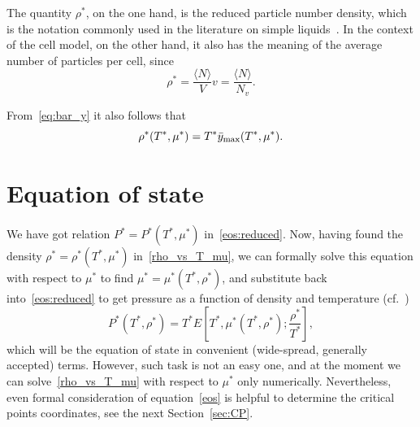 \documentclass[12pt]{article}
\numberwithin{equation}{section}
\begin{document}
	The quantity $\rho^*$, on the one hand, is the reduced particle number density, which is the notation commonly used in the literature on simple liquids~\cite{HansenMcDonald13}. In the context of the cell model, on the other hand, it also has the meaning of the average number of particles per cell, since
	\begin{equation}
		\rho^* = \frac{\langle N \rangle}{V} v = \frac{\langle N \rangle}{N_v}.
	\end{equation}
	
	From~\eqref{eq:bar_y} it also follows that
	\begin{equation}
		\label{rho_vs_T_mu}
		\rho^*(T^*,\mu^*) = T^* \bar{y}_{\rm max}(T^*,\mu^*).
	\end{equation}
	
	\section{Equation of state}
	We have got relation $P^* = P^*(T^*, \mu^*)$ in~\eqref{eos:reduced}. Now, having found the density $\rho^* = \rho^*(T^*,\mu^*)$ in~\eqref{rho_vs_T_mu}, we can formally solve this equation with respect to $\mu^*$ to find $\mu^* = \mu^*(T^*,\rho^*)$, and substitute back into~\eqref{eos:reduced} to get pressure as a function of density and temperature (cf.~\cite[(2.28)]{KKD20})
	\begin{equation}
		\label{eos}
		P^*(T^*,\rho^*) = T^* E\left[T^*, \mu^*(T^*,\rho^*); \frac{\rho^*}{T^*}\right],
	\end{equation}
	which will be the equation of state in convenient (wide-spread, generally accepted) terms. However, such task is not an easy one, and at the moment we can solve~\eqref{rho_vs_T_mu} with respect to $\mu^*$ only numerically. Nevertheless, even formal consideration of equation~\eqref{eos} is helpful to determine the critical points coordinates, see the next Section~\ref{sec:CP}.
	
	\pagebreak
\end{document}
